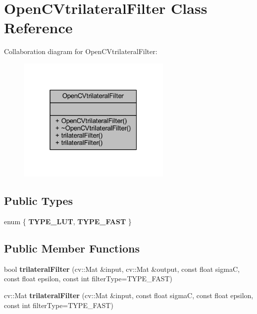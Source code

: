 \hypertarget{class_open_c_vtrilateral_filter}{}\section{Open\+C\+Vtrilateral\+Filter Class Reference}
\label{class_open_c_vtrilateral_filter}


Collaboration diagram for Open\+C\+Vtrilateral\+Filter\+:
\nopagebreak
\begin{figure}[H]
\begin{center}
\leavevmode
\includegraphics[width=211pt]{class_open_c_vtrilateral_filter__coll__graph}
\end{center}
\end{figure}
\subsection*{Public Types}
\begin{DoxyCompactItemize}
\item 
\mbox{\label{class_open_c_vtrilateral_filter_a7d552e7b9918da0721e5c91638ef19ca}} 
enum \{ {\bfseries T\+Y\+P\+E\+\_\+\+L\+UT}, 
{\bfseries T\+Y\+P\+E\+\_\+\+F\+A\+ST}
 \}
\end{DoxyCompactItemize}
\subsection*{Public Member Functions}
\begin{DoxyCompactItemize}
\item 
\mbox{\label{class_open_c_vtrilateral_filter_a01d5a2f9a2a8ae76906e1349f739a7bf}} 
bool {\bfseries trilateral\+Filter} (cv\+::\+Mat \&input, cv\+::\+Mat \&output, const float sigmaC, const float epsilon, const int filter\+Type=T\+Y\+P\+E\+\_\+\+F\+A\+ST)
\item 
\mbox{\label{class_open_c_vtrilateral_filter_ae1c2335bae77ec838b302dbfc41bd308}} 
cv\+::\+Mat {\bfseries trilateral\+Filter} (cv\+::\+Mat \&input, const float sigmaC, const float epsilon, const int filter\+Type=T\+Y\+P\+E\+\_\+\+F\+A\+ST)
\end{DoxyCompactItemize}


